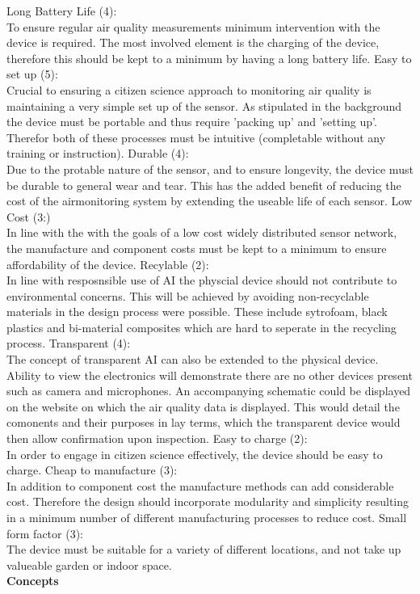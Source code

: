 Long Battery Life (4):\\
To ensure regular air quality measurements minimum intervention with the device is required. The most involved element is the charging of the device, therefore this should be kept to a minimum by having a long battery life.
\vskip 0.1in
Easy to set up (5):\\
Crucial to ensuring a citizen science approach to monitoring air quality is maintaining a very simple set up of the sensor. As stipulated in the background the device must be portable and thus require 'packing up' and 'setting up'. Therefor both of these processes must be intuitive (completable without any training or instruction).
\vskip 0.1in
Durable (4):\\
Due to the protable nature of the sensor, and to ensure longevity, the device must be durable to general wear and tear. This has the added benefit of reducing the cost of the airmonitoring system by extending the useable life of each sensor.
\vskip 0.1in
Low Cost (3:)\\
In line with the with the goals of a low cost widely distributed sensor network, the manufacture and component costs must be kept to a minimum to ensure affordability of the device.
\vskip 0.1in
Recylable (2):\\
In line with resposnsible use of AI the physcial device should not contribute to environmental concerns. This will be achieved by avoiding non-recyclable materials in the design process were possible. These include sytrofoam, black plastics and bi-material composites which are hard to seperate in the recycling process.
\vskip 0.1in
Transparent (4):\\
The concept of transparent AI can also be extended to the physical device. Ability to view the electronics will demonstrate there are no other devices present such as camera and microphones. An accompanying schematic could be displayed on the website on which the air quality data is displayed. This would detail the comonents and their purposes in lay terms, which the transparent device would then allow confirmation upon inspection.
\vskip 0.1in
Easy to charge (2):\\
In order to engage in citizen science effectively, the device should be easy to charge.
\vskip 0.1in
Cheap to manufacture (3):\\
In addition to component cost the manufacture methods can add considerable cost. Therefore the design should incorporate modularity and simplicity resulting in a minimum number of different manufacturing processes to reduce cost.
\vskip 0.1in
Small form factor (3):\\
The device must be suitable for a variety of different locations, and not take up valueable garden or indoor space.\\
\vskip 0.1in
\textbf{Concepts}\\


